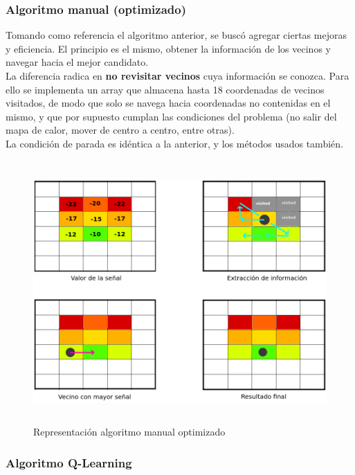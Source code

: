 \subsubsection{Algoritmo manual (optimizado)}
\label{subsec:alg-manual-opt}

Tomando como referencia el algoritmo anterior, se buscó agregar ciertas mejoras y eficiencia. El principio es el mismo, obtener la información de los vecinos y navegar hacia el mejor candidato.\\

La diferencia radica en \textbf{no revisitar vecinos} cuya información se conozca. Para ello se implementa un array que almacena hasta 18 coordenadas de vecinos visitados, de modo que solo se navega hacia coordenadas no contenidas en el mismo, y que por supuesto cumplan las condiciones del problema (no salir del mapa de calor, mover de centro a centro, entre otras).\\

La condición de parada es idéntica a la anterior, y los métodos usados también.\\

\begin{figure} [H]
    \begin{center}
    \includegraphics[height=10cm]{imagenes/cap4/10_algoritmo_optimizado.png}
    \end{center}
    \caption[Representación algoritmo manual optimizado]{Representación algoritmo manual optimizado}
    \label{fig:opt_algorithm}
\end{figure}

\subsubsection{Algoritmo Q-Learning}
\label{subsec:alg-q}

